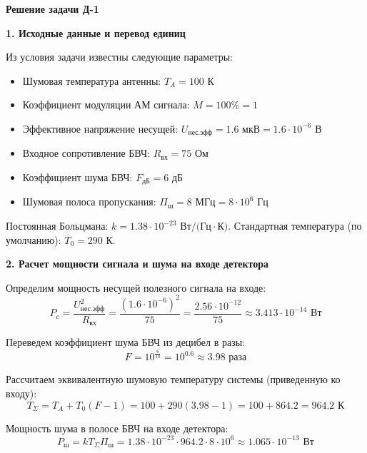 \textbf{Решение задачи Д-1}

\vspace{1em}
\textbf{1. Исходные данные и перевод единиц}

Из условия задачи известны следующие параметры:
\begin{itemize}
    \item Шумовая температура антенны: $T_A = 100 \text{ К}$
    \item Коэффициент модуляции АМ сигнала: $M = 100\% = 1$
    \item Эффективное напряжение несущей: $U_{\text{нес.эфф}} = 1.6 \text{ мкВ} = 1.6 \cdot 10^{-6} \text{ В}$
    \item Входное сопротивление БВЧ: $R_{\text{вх}} = 75 \text{ Ом}$
    \item Коэффициент шума БВЧ: $F_{\text{дБ}} = 6 \text{ дБ}$
    \item Шумовая полоса пропускания: $\Pi_{\text{ш}} = 8 \text{ МГц} = 8 \cdot 10^6 \text{ Гц}$
\end{itemize}
Постоянная Больцмана: $k = 1.38 \cdot 10^{-23} \text{ Вт/(Гц}\cdot\text{К)}$. 
Стандартная температура (по умолчанию): $T_0 = 290 \text{ К}$.

\vspace{1em}
\textbf{2. Расчет мощности сигнала и шума на входе детектора}

Определим мощность несущей полезного сигнала на входе:
\begin{equation*}
    P_c = \frac{U_{\text{нес.эфф}}^2}{R_{\text{вх}}} = \frac{(1.6 \cdot 10^{-6})^2}{75} = \frac{2.56 \cdot 10^{-12}}{75} \approx 3.413 \cdot 10^{-14} \text{ Вт}
\end{equation*}

Переведем коэффициент шума БВЧ из децибел в разы:
\begin{equation*}
    F = 10^{\frac{6}{10}} = 10^{0.6} \approx 3.98 \text{ раза}
\end{equation*}

Рассчитаем эквивалентную шумовую температуру системы (приведенную ко входу):
\begin{equation*}
    T_{\Sigma} = T_A + T_0(F - 1) = 100 + 290(3.98 - 1) = 100 + 864.2 = 964.2 \text{ К}
\end{equation*}

Мощность шума в полосе БВЧ на входе детектора:
\begin{equation*}
    P_{\text{ш}} = k T_{\Sigma} \Pi_{\text{ш}} = 1.38 \cdot 10^{-23} \cdot 964.2 \cdot 8 \cdot 10^6 \approx 1.065 \cdot 10^{-13} \text{ Вт}
\end{equation*}

